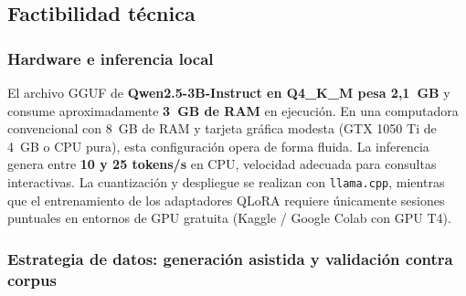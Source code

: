 \subsection{Factibilidad técnica}

\subsubsection{Hardware e inferencia local}

El archivo GGUF de \textbf{Qwen2.5-3B-Instruct en Q4\_K\_M pesa 2,1~GB} y consume aproximadamente \textbf{3~GB de RAM} en ejecución. En una computadora convencional con 8~GB de RAM y tarjeta gráfica modesta (GTX 1050 Ti de 4~GB o CPU pura), esta configuración opera de forma fluida. La inferencia genera entre \textbf{10 y 25 tokens/s} en CPU, velocidad adecuada para consultas interactivas. La cuantización y despliegue se realizan con \texttt{llama.cpp}, mientras que el entrenamiento de los adaptadores QLoRA requiere únicamente sesiones puntuales en entornos de GPU gratuita (Kaggle / Google Colab con GPU T4).

\subsubsection{Estrategia de datos: generación asistida y validación contra corpus}
\label{sec:estrategia_datos}

